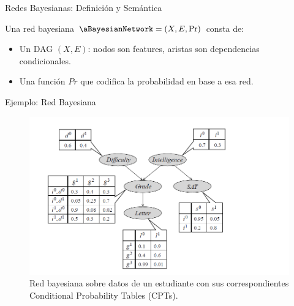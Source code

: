 \begin{frame}{Redes Bayesianas: Definición y Semántica}
\begin{mydefinition}
    Una red bayesiana $\aBayesianNetwork = (X, E, \Pr)$ consta de:
    \begin{itemize}
        \item Un DAG $(X,E)$: nodos son features, aristas son dependencias condicionales.
        \item Una función $Pr$ que codifica la probabilidad en base a esa red. %
    \end{itemize}
\end{mydefinition}

\end{frame}

\begin{frame}{Ejemplo: Red Bayesiana}
\begin{figure}
    \centering
    \includegraphics[scale=0.35]{pic/img/bayesianNetworks/bayesianNetworks.png}
    \caption*{Red bayesiana sobre datos de un estudiante con sus correspondientes Conditional Probability Tables (CPTs).  }%
\end{figure}
\end{frame}

